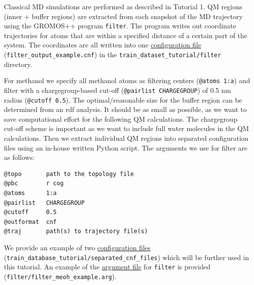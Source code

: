 Classical MD simulations are performed as described in Tutorial 1. QM regions (inner + buffer regions) are extracted from each snapshot of the MD trajectory using the GROMOS++ program \texttt{filter}. The program writes out coordinate trajectories for atoms that are within a specified distance of a certain part of the system. The coordinates are all written into one \href{https://github.com/LierB/gromos_tutorial_livecoms/blob/burnn_tutorial_rc/tutorial_files/t_06/train_dataset_tutorial/filter/filter_output_example.cnf}{configuration file} (\texttt{filter\_output\_example.cnf}) in the \texttt{train\_dataset\_tutorial/filter} directory.

For methanol we specify all methanol atoms as filtering centers (\texttt{@atoms 1:a}) and filter with a chargegroup-based cut-off (\texttt{@pairlist CHARGEGROUP}) of 0.5 nm radius (\texttt{@cutoff 0.5}). The optimal/reasonable size for the buffer region can be determined from an rdf analysis. It should be as small as possible, as we want to save computational effort for the following QM calculations. The chargegroup cut-off scheme is important as we want to include full water molecules in the QM calculations. Then we extract individual QM regions into separated configuration files using an in-house written Python script. The arguments we use for filter are as follows:

\begin{lstlisting}[breaklines=true, breakatwhitespace=false]
@topo       path to the topology file
@pbc        r cog
@atoms      1:a
@pairlist   CHARGEGROUP
@cutoff     0.5
@outformat  cnf
@traj       path(s) to trajectory file(s)
\end{lstlisting}

We provide an example of two \href{https://github.com/LierB/gromos_tutorial_livecoms/tree/burnn_tutorial_rc/tutorial_files/t_06/train_dataset_tutorial/separated_cnf_files}{configuration files} (\texttt{train\_database\_tutorial/separated\_cnf\_files}) which will be further used in this tutorial. An example of the \href{https://github.com/LierB/gromos_tutorial_livecoms/blob/burnn_tutorial_rc/tutorial_files/t_06/train_dataset_tutorial/filter/filter_meoh_example.arg}{argument file} for \texttt{filter} is provided (\texttt{filter/filter\_meoh\_example.arg}).

